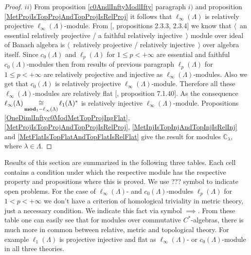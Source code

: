 \begin{proof}
$ii)$ From proposition \ref{c0AndlInftyModlIfty} paragraph $i)$ and proposition \ref{MetProjIsTopProjAndTopProjIsRelProj} it follows that $\ell_\infty(\Lambda)$ is relatively projective $\ell_\infty(\Lambda)$-module. From [\cite{RamsHomPropSemgroupAlg}, propositions 2.3.3, 2.3.4] we know that $\langle$~an essential relatively projective / a  faithful relatively injective~$\rangle$ module over ideal of Banach algebra is $\langle$~relatively projective / relatively injective~$\rangle$ over algebra itself. Since $c_0(\Lambda)$ and $\ell_p(\Lambda)$ for $1\leq p<+\infty$ are essential and faithful $c_0(\Lambda)$-modules then from results of previous paragraph $\ell_p(\Lambda)$ for $1\leq p<+\infty$ are relatively projective and injective as $\ell_\infty(\Lambda)$-modules. Also we get that $c_0(\Lambda)$ is relatively projective $\ell_\infty(\Lambda)$-module. Therefore all these $\ell_\infty(\Lambda)$-modules are relatively flat [\cite{HelBanLocConvAlg}, proposition 7.1.40]. As the consequence $\ell_\infty(\Lambda)\mathop{\mathbin{\cong}}\limits_{\mathbf{mod}_1-\ell_\infty(\Lambda)}\ell_1(\Lambda)^*$ is relatively injective $\ell_\infty(\Lambda)$-module.  Propositions \ref{OneDimlInftyc0ModMetTopProjIngFlat}, \ref{MetProjIsTopProjAndTopProjIsRelProj}, \ref{MetInjIsTopInjAndTopInjIsRelInj} and \ref{MetFlatIsTopFlatAndTopFlatIsRelFlat} give the result for modules $\mathbb{C}_\lambda$, where $\lambda\in\Lambda$.
\end{proof}

Results of this section are summarized in the following three tables. Each cell contains a condition under which the respective module has the respective property and propositions where this is proved. We use ??? symbol to indicate open problems. For the case of $\ell_\infty(\Lambda)$- and $c_0(\Lambda)$-modules $\ell_p(\Lambda)$ for $1<p<+\infty$ we don't have a criterion of homological triviality in metric theory, just a necessary condition. We indicate this fact via symbol $\implies$. From these table one can easily see that for modules over commutative $C^*$-algebras, there is much more in common between relative, metric and topological  theory. For example $\ell_1(\Lambda)$ is projective injective and flat as $\ell_\infty(\Lambda)$- or $c_0(\Lambda)$-module in all three theories.


